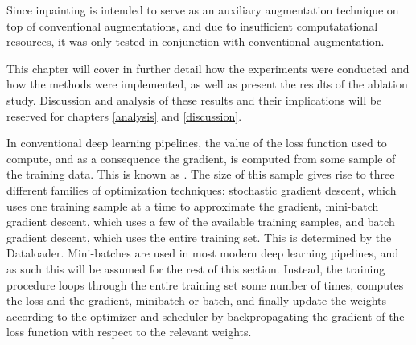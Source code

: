 Since inpainting is intended to serve as an auxiliary augmentation technique on top of conventional augmentations, and due to insufficient computatational resources, it was only tested in conjunction with conventional augmentation.  

This chapter will cover in further detail how the experiments were conducted and how the methods were implemented, as well as present the results of the ablation study. Discussion and analysis of these results and their implications will be reserved for chapters \ref{analysis} and \ref{discussion}. 

          In conventional deep learning pipelines, the value of the loss function used to compute, and as a consequence the gradient, is computed from some sample of the training data. This is known as . The size of this sample gives rise to three different families of optimization techniques: stochastic gradient descent, which uses one training sample at a time to approximate the gradient, mini-batch gradient descent, which uses a few of the available training samples, and batch gradient descent, which uses the entire training set. This is determined by the Dataloader. Mini-batches are used in most modern deep learning pipelines, and as such this will be assumed for the rest of this section.
          Instead, the training procedure loops through the entire training set some number of times, computes the loss and the gradient, minibatch or batch, and finally update the weights according to the optimizer and scheduler by backpropagating the gradient of the loss function with respect to the relevant weights.